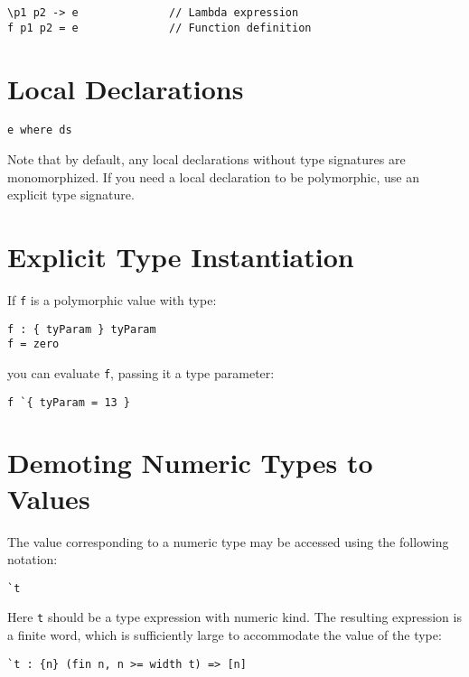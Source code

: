 \begin{verbatim}
\p1 p2 -> e              // Lambda expression
f p1 p2 = e              // Function definition
\end{verbatim}

\section{Local Declarations}\label{local-declarations}

\begin{verbatim}
e where ds
\end{verbatim}

Note that by default, any local declarations without type signatures are
monomorphized. If you need a local declaration to be polymorphic, use an
explicit type signature.

\section{Explicit Type Instantiation}\label{explicit-type-instantiation}

If \texttt{f} is a polymorphic value with type:

\begin{verbatim}
f : { tyParam } tyParam
f = zero
\end{verbatim}

you can evaluate \texttt{f}, passing it a type parameter:

\begin{verbatim}
f `{ tyParam = 13 }
\end{verbatim}

\section{Demoting Numeric Types to
Values}\label{demoting-numeric-types-to-values}

The value corresponding to a numeric type may be accessed using the
following notation:

\begin{verbatim}
`t
\end{verbatim}

Here \texttt{t} should be a type expression with numeric kind. The
resulting expression is a finite word, which is sufficiently large to
accommodate the value of the type:

\begin{verbatim}
`t : {n} (fin n, n >= width t) => [n]
\end{verbatim}


